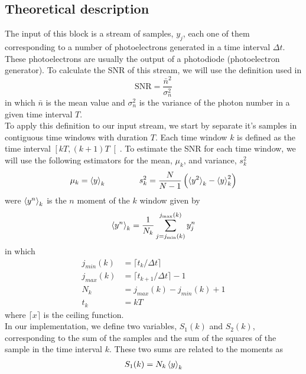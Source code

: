 \begin{refsection}
\subsection*{Theoretical description}
%
The input of this block is a stream of samples, $y_j$, each one of them corresponding to a number of photoelectrons generated in a time interval $\Delta t$. These photoelectrons are usually the output of a photodiode (photoelectron generator).
To calculate the SNR of this stream, we will use the definition used in
\cite{saleh1991}
%
\begin{equation}
	\textrm{SNR} = \frac{\bar{n}^2}{\sigma_n^2}
\end{equation}
%
in which $\bar{n}$ is the mean value and $\sigma_n^2$ is the variance of the photon number in a given time interval $T$.
\\
To apply this definition to our input stream, we start by separate it's samples in contiguous time windows with duration $T$. Each time window $k$ is defined as the time interval $\left[ k T, (k+1) T \right[$. To estimate the SNR for each time window, we will use the following estimators for the mean, $\mu_k$, and variance, $s_k^2$
\cite{smith1997}
%
\begin{equation}
	\mu_k = \braket{y}_k
	\qquad \qquad
	s_k^2 = \frac{N}{N-1} \left( \braket{y^2}_k - \braket{y}_k^2 \right)
\end{equation}
%
were $\braket{y^n}_k$ is the $n$ moment of the $k$ window given by
%
\begin{equation}
	\braket{y^n}_k = \frac{1}{N_k} \sum_{j = j_\textrm{min}(k)}^{j_\textrm{max}(k)} y_j^n
\end{equation}
in which
\begin{align}
	j_{min}(k) &= \lceil{t_k/\Delta t \rceil}\\
	\label{eq:sample_limit_min}
	j_{max}(k) &= \lceil{t_{k+1}/\Delta t \rceil} - 1\\
	\label{eq:sample_limit_max}
	N_k &= j_{max}(k) - j_{min}(k) + 1\\
	\label{eq:n_window_samples}
	t_k &= k T
\end{align}
where $\lceil x \rceil$ is the ceiling function.\\
%
In our implementation, we define two variables, $S_1(k)$ and $S_2(k)$, corresponding to the sum of the samples and the sum of the squares of the sample in the time interval $k$.
These two sums are related to the moments as
\begin{align}
	S_1(k) &= N_k \braket{y}_k\\

\end{align}
\end{refsection}
